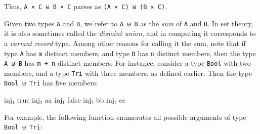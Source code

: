 Thus, \texttt{A\ ×\ C\ ⊎\ B\ ×\ C} parses as
\texttt{(A\ ×\ C)\ ⊎\ (B\ ×\ C)}.

Given two types \texttt{A} and \texttt{B}, we refer to \texttt{A\ ⊎\ B}
as the \emph{sum} of \texttt{A} and \texttt{B}. In set theory, it is
also sometimes called the \emph{disjoint union}, and in computing it
corresponds to a \emph{variant record} type. Among other reasons for
calling it the sum, note that if type \texttt{A} has \texttt{m} distinct
members, and type \texttt{B} has \texttt{n} distinct members, then the
type \texttt{A\ ⊎\ B} has \texttt{m\ +\ n} distinct members. For
instance, consider a type \texttt{Bool} with two members, and a type
\texttt{Tri} with three members, as defined earlier. Then the type
\texttt{Bool\ ⊎\ Tri} has five members:

\begin{myDisplay}
inj₁ true     inj₂ aa
inj₁ false    inj₂ bb
              inj₂ cc
\end{myDisplay}

For example, the following function enumerates all possible arguments of
type \texttt{Bool\ ⊎\ Tri}:

\begin{fence}
\begin{code}%
\>[0]\AgdaSpace{}%
\AgdaSymbol{:}\AgdaSpace{}%
\AgdaSpace{}%
\AgdaSpace{}%
\AgdaSpace{}%
\AgdaSpace{}%
\<%
\\
\>[0]\AgdaSpace{}%
\AgdaSymbol{(}\AgdaSpace{}%
\AgdaSymbol{)}%
\>[22]\AgdaSymbol{=}%
\>[25]\<%
\\
\>[0]\AgdaSpace{}%
\AgdaSymbol{(}\AgdaSpace{}%
\AgdaSymbol{)}%
\>[22]\AgdaSymbol{=}%
\>[25]\<%
\\
\>[0]\AgdaSpace{}%
\AgdaSymbol{(}\AgdaSpace{}%
\AgdaSymbol{)}%
\>[22]\AgdaSymbol{=}%
\>[25]\<%
\\
\>[0]\AgdaSpace{}%
\AgdaSymbol{(}\AgdaSpace{}%
\AgdaSymbol{)}%
\>[22]\AgdaSymbol{=}%
\>[25]\<%
\\
\>[0]\AgdaSpace{}%
\AgdaSymbol{(}\AgdaSpace{}%
\AgdaSymbol{)}%
\>[22]\AgdaSymbol{=}%
\>[25]\<%
\end{code}
\end{fence}

